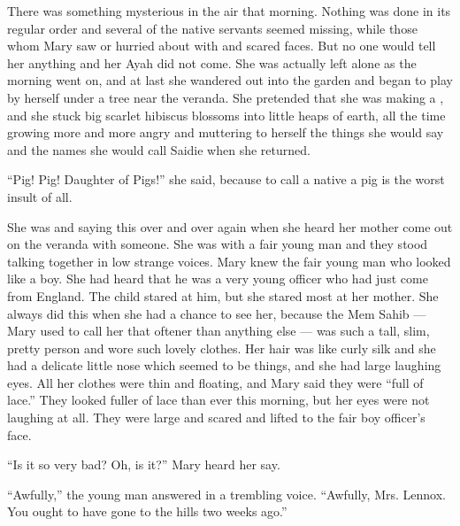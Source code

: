 \documentclass{fiche}
\begin{document}
\begin{texte}
There was something mysterious in the air that morning. Nothing was done in its regular order
and several of the native servants seemed missing, while those whom Mary saw
 or hurried about with
 and scared faces. But no one would tell her anything and her
Ayah did not come. She was actually left alone as the morning went on, and at last she
wandered out into the garden and began to play by herself under a tree near the veranda. She
pretended that she was making a , and she
stuck big scarlet hibiscus blossoms into little heaps of earth, all the time growing more and
more angry and muttering to herself the things she would say and the names she would call
Saidie when she returned.

``Pig! Pig! Daughter of Pigs!'' she said, because to call a native a pig is the worst insult
of all.

She was  and saying this over
and over again when she heard her mother come out on the veranda with someone. She was with a
fair young man and they stood talking together in low strange voices. Mary knew the fair
young man who looked like a boy. She had heard that he was a very young officer who had just
come from England. The child stared at him, but she stared most at her mother. She always did
this when she had a chance to see her, because the Mem Sahib --- Mary used to call her that
oftener than anything else --- was such a tall, slim, pretty person and wore such lovely
clothes. Her hair was like curly silk and she had a delicate little nose which seemed to be
 things, and she had large laughing eyes. All her
clothes were thin and floating, and Mary said they were ``full of lace.'' They looked fuller
of lace than ever this morning, but her eyes were not laughing at all. They were large and
scared and lifted  to the fair boy officer's
face.

``Is it so very bad? Oh, is it?'' Mary heard her say.

``Awfully,'' the young man answered in a trembling voice. ``Awfully, Mrs. Lennox. You ought
to have gone to the hills two weeks ago.''
\end{texte}

\end{document}
